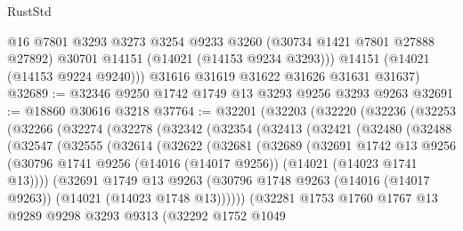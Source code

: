 \begin{lexlean}{RustStd}
\begin{coremodule}
          @16
          @7801
          @3293
          @3273
          @3254
          @9233
          @3260
          (@30734 @1421 @7801 @27888 @27892)
          @30701
          @14151
          (@14021 (@14153 @9234 @3293)))
        @14151
        (@14021 (@14153 @9224 @9240)))
      @31616
      @31619
      @31622
      @31626
      @31631
      @31637)
@32689 := @32346 @9250 @1742 @1749 @13 @3293 @9256 @3293 @9263
@32691 := @18860 @30616 @3218
@37764 := @32201
    (@32203
      (@32220
        (@32236
          (@32253
            (@32266
              (@32274
                (@32278
                  (@32342
                    (@32354
                      (@32413
                        (@32421
                          (@32480
                            (@32488
                              (@32547
                                (@32555
                                  (@32614
                                    (@32622
                                      (@32681
                                        (@32689
                                          (@32691
                                            @1742
                                            @13
                                            @9256
                                            (@30796
                                              @1741
                                              @9256
                                              (@14016 (@14017 @9256))
                                              (@14021 (@14023 @1741 @13))))
                                          (@32691
                                            @1749
                                            @13
                                            @9263
                                            (@30796
                                              @1748
                                              @9263
                                              (@14016 (@14017 @9263))
                                              (@14021 (@14023 @1748 @13))))))
                                      (@32281
                                        @1753
                                        @1760
                                        @1767
                                        @13
                                        @9289
                                        @9298
                                        @3293
                                        @9313
                                        (@32292
                                          @1752
                                          @1049

\end{coremodule}
\end{lexlean}
